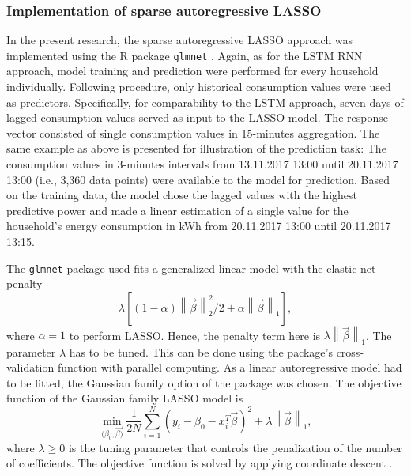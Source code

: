 \subsubsection{Implementation of sparse autoregressive LASSO}

In the present research, the sparse autoregressive LASSO approach was implemented using the R package \texttt{glmnet} \citep{Friedman:2010}. Again, as for the LSTM RNN approach, model training and prediction were performed for every household individually. Following \cites{Li:2017} procedure, only historical consumption values were used as predictors. Specifically, for comparability to the LSTM approach, seven days of lagged consumption values served as input to the LASSO model. The response vector consisted of single consumption values in 15-minutes aggregation. The same example as above is presented for illustration of the prediction task: The consumption values in 3-minutes intervals from 13.11.2017 13:00 until 20.11.2017 13:00 (i.e., 3,360 data points) were available to the model for prediction. 
Based on the training data, the model chose the lagged values with the highest predictive power and made a linear estimation of a single value for the household's energy consumption in kWh from 20.11.2017 13:00 until 20.11.2017 13:15.

The \texttt{glmnet} package used fits a generalized linear model with the  elastic-net penalty
%
\begin{equation} \label{Eq:elasticnetpenalty}
    \lambda\left[(1-\alpha)\left\lVert\vec{\beta}\right\rVert^2_2/2 + \alpha \left\lVert\vec{\beta}\right\rVert_1\right],
\end{equation}
%
where $\alpha=1$ to perform LASSO. Hence, the penalty term here is $\lambda\left\lVert\vec{\beta}\right\rVert_1$. The parameter $\lambda$ has to be tuned. This can be done using the package's cross-validation function with parallel computing. As a linear autoregressive model had to be fitted, the Gaussian family option of the package was chosen. The objective function of the Gaussian family LASSO model is
%
\begin{equation} \label{Eq:glmnetobjfun}
    \min_{(\beta_0, \vec{\beta)}}\frac{1}{2N} \sum_{i=1}^N (y_i -\beta_0-x_i^T\vec{\beta})^2+\lambda\left\lVert\vec{\beta}\right\rVert_1,
\end{equation}
%
where $\lambda \geq 0$ is the tuning parameter that controls the penalization of the number of coefficients. The objective function is solved by applying coordinate descent \citep[see][]{Friedman:2010}.

